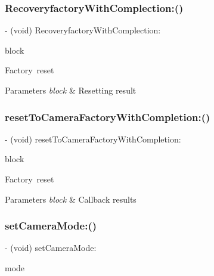 \subsubsection{\texorpdfstring{Recoveryfactory\+With\+Complection\+:()}{RecoveryfactoryWithComplection:()}}
{\footnotesize\ttfamily -\/ (void) Recoveryfactory\+With\+Complection\+: \begin{DoxyParamCaption}\item[{(P\+V\+Completion\+Block)}]{block }\end{DoxyParamCaption}}

Factory reset


\begin{DoxyParams}{Parameters}
{\em block} & Resetting result \\
\hline
\end{DoxyParams}
\mbox{\label{interface_p_v_camera_a18a94868a2e12ac35d6afee0f2b0a35b}} 
\subsubsection{\texorpdfstring{reset\+To\+Camera\+Factory\+With\+Completion\+:()}{resetToCameraFactoryWithCompletion:()}}
{\footnotesize\ttfamily -\/ (void) reset\+To\+Camera\+Factory\+With\+Completion\+: \begin{DoxyParamCaption}\item[{(P\+V\+Completion\+Block)}]{block }\end{DoxyParamCaption}}

Factory reset


\begin{DoxyParams}{Parameters}
{\em block} & Callback results \\
\hline
\end{DoxyParams}
\mbox{\label{interface_p_v_camera_a925740abed7327808fa2f04a8198f0e2}} 
\subsubsection{\texorpdfstring{set\+Camera\+Mode\+:()}{setCameraMode:()}}
{\footnotesize\ttfamily -\/ (void) set\+Camera\+Mode\+: \begin{DoxyParamCaption}\item[{(P\+V\+Camera\+Mode)}]{mode }\end{DoxyParamCaption}}

